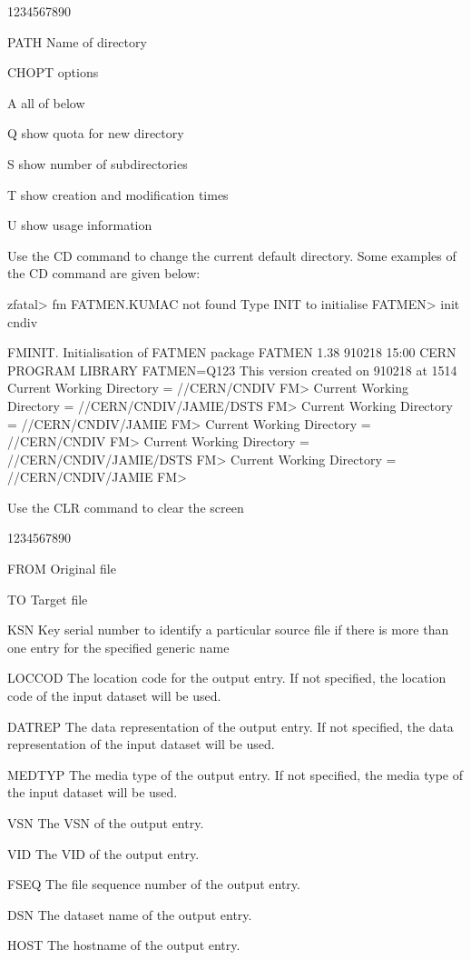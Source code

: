 \begin{DLtt}{1234567890}
\item[PATH]Name of directory
\item[CHOPT]options
\begin{DLtt}{12}
\item[A]all of below
\item[Q]show quota for new directory
\item[S]show number of subdirectories
\item[T]show creation and modification times
\item[U]show usage information
\end{DLtt}
\end{DLtt}
Use the CD command to change the current default directory.
Some examples of the CD command are given below:
\begin{XMP}
 
\lsb zfatal\rsb  > fm
 FATMEN.KUMAC not found
 Type INIT to initialise FATMEN> init cndiv
 
 FMINIT.  Initialisation of FATMEN package
 FATMEN   1.38  910218 15:00  CERN PROGRAM LIBRARY FATMEN=Q123
          This version created on      910218  at        1514
 Current Working Directory = //CERN/CNDIV
 FM> 
 Current Working Directory = //CERN/CNDIV/JAMIE/DSTS
 FM> 
 Current Working Directory = //CERN/CNDIV/JAMIE
 FM> 
 Current Working Directory = //CERN/CNDIV
 FM> 
 Current Working Directory = //CERN/CNDIV/JAMIE/DSTS
 FM> 
 Current Working Directory = //CERN/CNDIV/JAMIE
 FM>
 
\end{XMP}
Use the CLR command to clear the screen
\Sbox{CP}{CP}{FROM TO [KSN] [LOCCOD DATREP MEDTYP VSN VID FSEQ DSN HOST}
\begin{DLtt}{1234567890}
\item[FROM]Original file
\item[TO]Target file
\item[KSN]Key serial number to identify a particular source file if
there is more than one entry for the specified generic name
\item[LOCCOD]The location code for the output entry. 
If not specified, the location code of the input dataset will be used.
\item[DATREP]The data representation of the output entry.
If not specified, the data representation of the input dataset will be used.
\item[MEDTYP]The media type of the output entry.
If not specified, the media type of the input dataset will be used.
\item[VSN]The VSN of the output entry.
\item[VID]The VID of the output entry.
\item[FSEQ]The file sequence number of the output entry.
\item[DSN]The dataset name of the output entry.
\item[HOST]The hostname of the output entry.
\end{DLtt}
